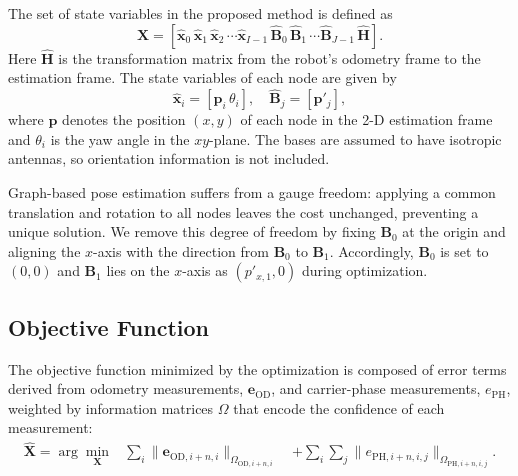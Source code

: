 \documentclass[conference]{IEEEtran}
\begin{document}
The set of state variables in the proposed method is defined as
\begin{equation}
    \mathbf{X} = \left[\mathbf{\hat{x}}_0\, \mathbf{\hat{x}}_1\, \mathbf{\hat{x}}_2\, \cdots \mathbf{\hat{x}}_{I-1}\, \mathbf{\hat{B}}_0\, \mathbf{\hat{B}}_1\, \cdots \mathbf{\hat{B}}_{J-1}\, \mathbf{\hat{H}}\right].
\end{equation}
Here $\mathbf{\hat{H}}$ is the transformation matrix from the robot's odometry frame to the estimation frame.
The state variables of each node are given by
\begin{equation}
   \mathbf{\hat{x}}_i = \left[\mathbf{p}_i\, \theta_{i}\right], \quad
   \mathbf{\hat{B}}_j = \left[\mathbf{p}'_j\right],
\end{equation}
where $\mathbf{p}$ denotes the position $(x,y)$ of each node in the 2-D estimation frame and $\theta_i$ is the yaw angle in the $xy$-plane.
The bases are assumed to have isotropic antennas, so orientation information is not included.

Graph-based pose estimation suffers from a gauge freedom: applying a common translation and rotation to all nodes leaves the cost unchanged, preventing a unique solution.
We remove this degree of freedom by fixing $\mathbf{B}_0$ at the origin and aligning the $x$-axis with the direction from $\mathbf{B}_0$ to $\mathbf{B}_1$.
Accordingly, $\mathbf{B}_0$ is set to $(0,0)$ and $\mathbf{B}_1$ lies on the $x$-axis as $(p'_{x,1}, 0)$ during optimization.

\subsection{Objective Function}
The objective function minimized by the optimization is composed of error terms derived from odometry measurements, $\mathbf{e}_{\mathrm{OD}}$, and carrier-phase measurements, $e_{\mathrm{PH}}$, weighted by information matrices $\Omega$ that encode the confidence of each measurement:
\begin{align}
    \hat{\mathbf{X}} = \arg\min_{\mathbf{X}} &\sum_{i}\|\mathbf{e}_{\mathrm{OD},i+n,i}\|_{\Omega_{\mathrm{OD},i+n,i}} \
    &+ \sum_{i}\sum_{j}\|e_{\mathrm{PH},i+n,i,j}\|_{\Omega_{\mathrm{PH},i+n,i,j}}.
\end{align}
\end{document}
